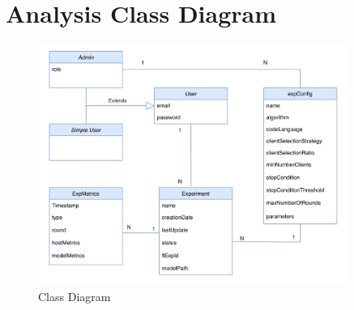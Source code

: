 
\newpage
\section{Analysis Class Diagram}

\begin{figure}[ht!]
    \centering
    \includegraphics[width=0.9\textwidth]{images/2_analisys/FL_class_diag.png}
    \caption{Class Diagram}
    \label{fig:class_diagram}
\end{figure}

